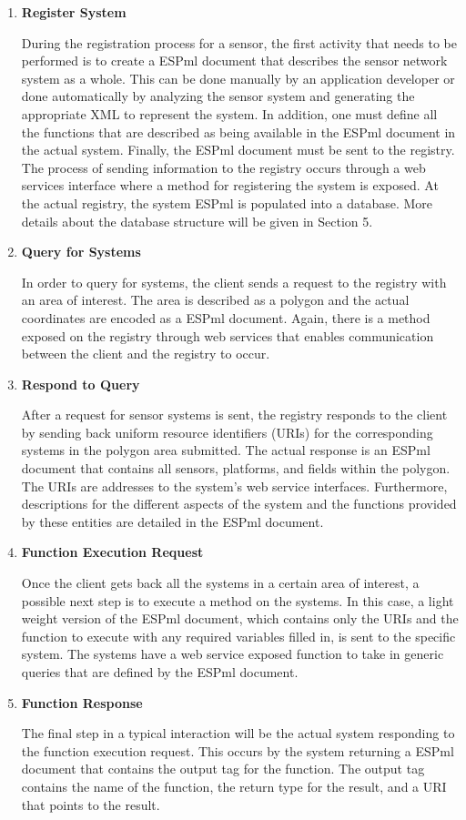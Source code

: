 \begin{enumerate} \item \textbf{Register System}

During the registration process for a sensor, the first activity that needs to be performed is to create a ESPml document that describes the sensor network system as a whole.  This can be
done manually by an application developer or done automatically by analyzing the sensor system and generating the appropriate XML to represent the
system.  In addition, one must define all the functions that are described as being available in the ESPml document in the actual system.  Finally, the ESPml document must be sent to the
registry.  The process of sending information to the registry occurs through a web services interface where a method for registering the system is exposed.  At the actual registry, the
system ESPml is populated into a database.  More details about the database structure will be given in Section 5.

\item \textbf{Query for Systems}

In order to query for systems, the client sends a request to the registry with an area of interest.  The area is described as a polygon and the actual coordinates are encoded as a ESPml
document.  Again, there is a method exposed on the registry through web services that enables communication between the client and the registry to occur.

\item \textbf{Respond to Query}

After a request for sensor systems is sent, the registry responds to the client by sending back uniform resource identifiers (URIs) for the corresponding systems in the polygon area
submitted.  The actual response is an ESPml document that contains all sensors, platforms, and fields within the polygon. The URIs are addresses to the system's web service interfaces. 
Furthermore, descriptions for the different aspects of the system and the functions provided by these entities are detailed in the ESPml document.

\item \textbf{Function Execution Request}

Once the client gets back all the systems in a certain area of interest, a possible next step is to execute a method on the systems. In this 
case, a light weight version of the ESPml document, which contains only the URIs and the function to execute with any required variables filled in, is sent to the specific system.  
The systems have a web service exposed function to take in generic queries that are defined by the ESPml document.

\item \textbf{Function Response}

The final step in a typical interaction will be the actual system responding to the function execution request.  This occurs by the system returning a ESPml document that contains the
output tag for the function.  The output tag contains the name of the function, the return type for the result, and a URI that points to the result.

\end{enumerate}


